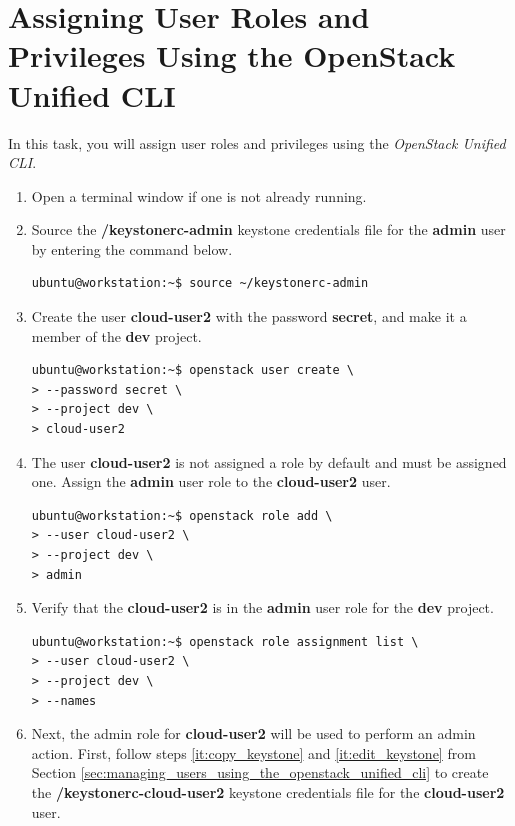 \documentclass[letterpaper, 12pt]{article}
\begin{document}
\section{Assigning User Roles and Privileges Using the OpenStack Unified CLI}
\label{sec:assigning_user_roles_and_privileges_using_the_openstack_unified_cli}
In this task, you will assign user roles and privileges using the \textit{OpenStack Unified CLI}.

\begin{enumerate}
    \item Open a terminal window if one is not already running.
    
    \item Source the \textbf{\texttildemid/keystonerc-admin} keystone credentials file for the
    \textbf{admin} user by entering the command below.
\begin{lstlisting}
ubuntu@workstation:~$ source ~/keystonerc-admin
\end{lstlisting}

    \item Create the user \textbf{cloud-user2} with the password \textbf{secret}, and make it a member of the
    \textbf{dev} project.
\begin{lstlisting}
ubuntu@workstation:~$ openstack user create \
> --password secret \
> --project dev \
> cloud-user2
\end{lstlisting}

    \item The user \textbf{cloud-user2} is not assigned a role by default and must be assigned one. Assign the
    \textbf{admin} user role to the \textbf{cloud-user2} user.
\begin{lstlisting}
ubuntu@workstation:~$ openstack role add \
> --user cloud-user2 \
> --project dev \
> admin
\end{lstlisting}

    \item Verify that the \textbf{cloud-user2} is in the \textbf{admin} user role for the \textbf{dev} project.
\begin{lstlisting}
ubuntu@workstation:~$ openstack role assignment list \
> --user cloud-user2 \
> --project dev \
> --names
\end{lstlisting}

    \item Next, the admin role for \textbf{cloud-user2} will be used to perform an admin action. First, follow steps
    \ref{it:copy_keystone} and \ref{it:edit_keystone} from Section
    \ref{sec:managing_users_using_the_openstack_unified_cli} to create the \textbf{\texttildemid/keystonerc-cloud-user2}
    keystone credentials file for the \textbf{cloud-user2} user.


\end{enumerate}
\end{document}
